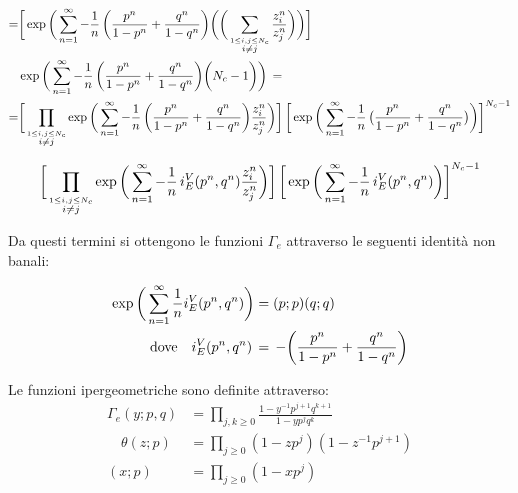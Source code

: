 \documentclass[a4paper,12pt]{article}
\begin{document}
  \begin{align*}
    =&\bigg[ \exp \bigg( \sum_{n=1}^{\infty} - {1 \over n} \, \bigg( {p^n \over 1-p^n} + {q^n \over 1-q^n} \bigg)  \bigg( \bigg( \sum_{\overset{ 1 \leq i,j \leq N_c}{i \neq j}}  {z_i^n \over z_j^n} \bigg) \bigg)\bigg] \\
	&    \exp \bigg( \sum_{n=1}^{\infty} - {1 \over n} \, \bigg( {p^n \over 1-p^n} + {q^n \over 1-q^n} \bigg)  \bigg( N_c - 1 \bigg) \bigg) \, = \\
=& \bigg[\prod_{\overset{ 1 \leq i,j \leq N_c}{i\neq j}} \exp \bigg( \sum_{n=1}^{\infty} - {1 \over n} \, \bigg( {p^n \over 1-p^n} + {q^n \over 1-q^n} \bigg)   {z_i^n \over z_j^n}\bigg) \bigg] \,
\bigg[ \exp \bigg( \sum_{n=1}^{\infty} - {1 \over n} \, \big( {p^n \over 1-p^n} + {q^n \over 1-q^n} \big) \bigg) \bigg] ^{N_c-1}
\end{align*}

\begin{equation}
\bigg[\prod_{\overset{ 1 \leq i,j \leq N_c}{i\neq j}} \exp \bigg( \sum_{n=1}^{\infty} - {1 \over n} \, i_E^V(p^n,q^n)  {z_i^n \over z_j^n}\bigg) \bigg] \,
\bigg[ \exp \bigg( \sum_{n=1}^{\infty} - {1 \over n} \,  i_E^V(p^n,q^n) \bigg) \bigg] ^{N_c-1}
\end{equation}

Da questi termini si ottengono le funzioni $\Gamma_e$ attraverso le seguenti identità non banali:


\begin{align}
  \exp \bigg( \sum_{n=1}^{\infty} {1 \over n} i_E^{V} (p^n,q^n) \bigg)  &= (p;p) (q;q) \,
  \label{Gamma_eVector} \\
 \mbox{dove} \quad i_E^V(p^n,q^n) \, &= \, - \bigg( {p^n \over 1-p^n} + {q^n \over 1-q^n} \bigg)
\end{align}

 Le funzioni ipergeometriche sono definite attraverso:
 $$
 \begin{aligned}
   \Gamma_e (y;p,q) &= \prod_{j,k \geq 0} \frac{ 1 - y^{-1} p^{j+1} q^{k+1}}{ 1 - y p^j q^k}\\
  \quad \theta(z;p) &= \prod_{j \geq 0 } (1- z p^j) ( 1- z^{-1}p^{j+1}) \\
  (x;p) &= \prod_{j \geq 0} ( 1- xp^j)
  \end{aligned}
$$
\end{document}
